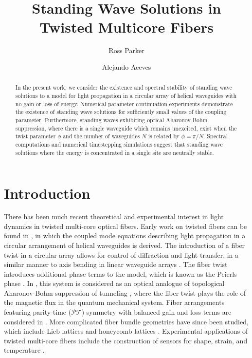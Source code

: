 \documentclass[12pt,reqno]{amsart}
\begin{document}
\title{Standing Wave Solutions in Twisted Multicore Fibers}

\author{Ross Parker}
\address{Department of Mathematics, Southern Methodist Univeristy, 
Dallas, TX 75275}

\author{Alejando Aceves}
\address{Department of Mathematics, Southern Methodist Univeristy, 
Dallas, TX 75275}

\begin{abstract}
In the present work, we consider the existence and spectral stability of standing wave solutions to a model for light propagation in a circular array of helical waveguides with no gain or loss of energy. Numerical parameter continuation experiments demonstrate the existence of standing wave solutions for sufficiently small values of the coupling parameter. Furthermore, standing waves exhibiting optical Aharonov-Bohm suppression, where there is a single waveguide which remains unexcited, exist when the twist parameter $\phi$ and the number of waveguides $N$ is related by $\phi = \pi/N$. Spectral computations and numerical timestepping simulations suggest that standing wave solutions where the energy is concentrated in a single site are neutrally stable. 
\end{abstract}

\maketitle

\section{Introduction}

There has been much recent theoretical and experimental interest in light dynamics in twisted multi-core optical fibers. Early work on twisted fibers can be found in \cite{Longhi2007,Longhi2007b}, in which the coupled mode equations describing light propagation in a circular arrangement of helical waveguides is derived. The introduction of a fiber twist in a circular array allows for control of diffraction and light transfer, in a similar manner to axis bending in linear waveguide arrays \cite{Longhi2005}. The fiber twist introduces additional phase terms to the model, which is known as the Peierls phase \cite{Longhi2007,Peierls1933}. In \cite{Ornigotti2007}, this system is considered as an optical analogue of topological Aharonov-Bohm suppression of tunneling \cite{Loss1992}, where the fiber twist plays the role of the magnetic flux in the quantum mechanical system. Fiber arrangements featuring parity-time ($\mathcal{PT}$) symmetry with balanced gain and loss terms are considered in \cite{Longhi2016,castro2016}. More complicated fiber bundle geometries have since been studied, which include Lieb lattices \cite{Marzuola2019bulk} and honeycomb lattices \cite{Ablowitz2014,Lumer2013}. Experimental applications of twisted multi-core fibers include the construction of sensors for shape, strain, and temperature \cite{Gannot2014,Westbrook2017}. 
\end{document}
